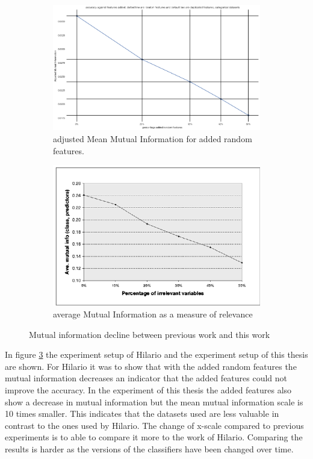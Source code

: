 \documentclass[a4paper,10pt]{article}
\begin{document}
\begin{figure}[H]
	\centering
	\begin{subfigure}[b]{0.45\textwidth}
		\includegraphics[width=\textwidth]{images/MutualInformationDecay.png}
		\caption{adjusted Mean Mutual Information for added random features.}
		\label{fig:AMMIdecay}
	\end{subfigure}
	\begin{subfigure}[b]{0.45\textwidth}
		\includegraphics[width=\textwidth]{images/MutualInformationDecay-paper.png}
		\caption{average Mutual Information as a measure of relevance}
		\label{fig:AMMIpaper}
	\end{subfigure}
	\caption{Mutual information decline between previous work and this work}\label{fig:AMMIs}
	\label{paper-thesis}
\end{figure}

In figure \ref{paper-thesis} the experiment setup of Hilario and the experiment setup of this thesis are shown\cite{Resil-1}. For Hilario it was to show that with the added random features the mutual information decreases an indicator that the added features could not improve the accuracy. In the experiment of this thesis the added features also show a decrease in mutual information but the mean mutual information scale is 10 times smaller. This indicates that the datasets used are less valuable in contrast to the ones used by Hilario. The change of x-scale compared to previous experiments is to able to compare it more to the work of Hilario. Comparing the results is harder as the versions of the classifiers have been changed over time.
\end{document}
